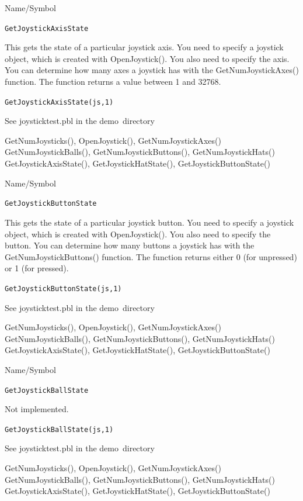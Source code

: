 \begin{desc}{Name/Symbol}
\item[Name/Symbol] \verb+GetJoystickAxisState+ 

\item[Description]  
  This gets the state of a particular joystick axis.  You need to specify a joystick object, which is created with OpenJoystick().  You also need to specify the axis.  You can determine how many axes a joystick has with the GetNumJoystickAxes() function.  The function returns  a value between 1 and 32768.

\item[Usage]          \verb+GetJoystickAxisState(js,1)+ 

\item[Example]
See joysticktest.pbl in the demo\ directory

\item[See Also]
GetNumJoysticks(), OpenJoystick(), GetNumJoystickAxes()
GetNumJoystickBalls(), GetNumJoystickButtons(), GetNumJoystickHats()
GetJoystickAxisState(), GetJoystickHatState(), GetJoystickButtonState()
\end{desc} 

\begin{desc}{Name/Symbol}
\item[Name/Symbol] \verb+GetJoystickButtonState+ 

\item[Description]  
  This gets the state of a particular joystick button.  You need to specify a joystick object, which is created with OpenJoystick().  You also need to specify the button.  You can determine how many buttons a joystick has with the GetNumJoystickButtons() function.  The function returns either 0 (for unpressed) or 1 (for pressed).

\item[Usage]         \verb+GetJoystickButtonState(js,1)+ 

\item[Example]
See joysticktest.pbl in the demo\ directory
\item[See Also]
GetNumJoysticks(), OpenJoystick(), GetNumJoystickAxes()
GetNumJoystickBalls(), GetNumJoystickButtons(), GetNumJoystickHats()
GetJoystickAxisState(), GetJoystickHatState(), GetJoystickButtonState()
\end{desc} 

\begin{desc}{Name/Symbol}
\item[Name/Symbol] \verb+GetJoystickBallState+ 

\item[Description]  
	Not implemented.
\item[Usage]        \verb+GetJoystickBallState(js,1)+ 

\item[Example]
See joysticktest.pbl in the demo\ directory
\item[See Also]
GetNumJoysticks(), OpenJoystick(), GetNumJoystickAxes()
GetNumJoystickBalls(), GetNumJoystickButtons(), GetNumJoystickHats()
GetJoystickAxisState(), GetJoystickHatState(), GetJoystickButtonState()
\end{desc} 

